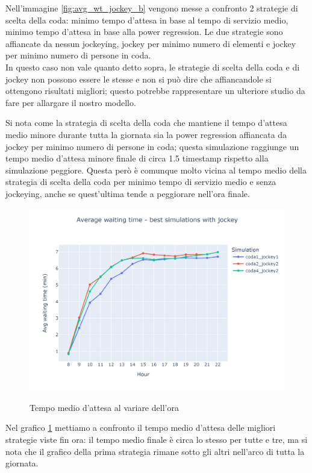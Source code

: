 Nell'immagine \ref{fig:avg_wt_jockey_b} vengono messe a confronto 2 strategie di scelta della coda: minimo tempo d'attesa in base al tempo di servizio medio, minimo tempo d'attesa in base alla power regression. Le due strategie sono affiancate da nessun jockeying, jockey per minimo numero di elementi e jockey per minimo numero di persone in coda. \\
In questo caso non vale quanto detto sopra, le strategie di scelta della coda e di jockey non possono essere le stesse e non si può dire che affiancandole si ottengono risultati migliori; questo potrebbe rappresentare un ulteriore studio da fare per allargare il nostro modello.

Si nota come la strategia di scelta della coda che mantiene il tempo d'attesa medio minore durante tutta la giornata sia la power regression affiancata da jockey per minimo numero di persone in coda; questa simulazione raggiunge un tempo medio d'attesa minore finale di circa 1.5 timestamp rispetto alla simulazione peggiore. Questa però è comunque molto vicina al tempo medio della strategia di scelta della coda per minimo tempo di servizio medio e senza jockeying, anche se quest'ultima tende a peggiorare nell'ora finale.

\begin{figure}[H]
	\centering
	\includegraphics[width=12cm]{"images/results/avg_wt_jockey_best.png"}
	\label{fig:avg_wt_jockey_best}
	\caption{Tempo medio d'attesa al variare dell'ora}
\end{figure}

Nel grafico \ref{fig:avg_wt_jockey_best} mettiamo a confronto il tempo medio d'attesa delle migliori strategie viste fin ora: il tempo medio finale è circa lo stesso per tutte e tre, ma si nota che il grafico della prima strategia rimane sotto gli altri nell'arco di tutta la giornata.

